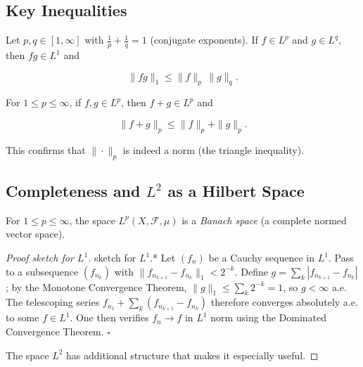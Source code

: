 \subsection{Key Inequalities}\label{sec:7.5.2}

\begin{theorem}\label{thm:7.28}
Let $p, q \in [1, \infty]$ with $\frac{1}{p} + \frac{1}{q} = 1$ (conjugate exponents). If $f \in L^p$ and $g \in L^q$, then $fg \in L^1$ and

\[
\|fg\|_1 \leq \|f\|_p \, \|g\|_q.
\]
\end{theorem}


\begin{theorem}\label{thm:7.29}
For $1 \leq p \leq \infty$, if $f, g \in L^p$, then $f + g \in L^p$ and

\[
\|f + g\|_p \leq \|f\|_p + \|g\|_p.
\]

This confirms that $\|\cdot\|_p$ is indeed a norm (the triangle inequality).
\end{theorem}


\subsection{Completeness and $L^2$ as a Hilbert Space}\label{sec:7.5.3}

\begin{theorem}\label{thm:7.30}
For $1 \leq p \leq \infty$, the space $L^p(X, \mathcal{F}, \mu)$ is a \textit{Banach space} (a complete normed vector space).
\end{theorem}


\begin{proof}[Proof sketch for $L^1$]
sketch for $L^1$.* Let $(f_n)$ be a Cauchy sequence in $L^1$. Pass to a subsequence $(f_{n_k})$ with $\|f_{n_{k+1}} - f_{n_k}\|_1 < 2^{-k}$. Define $g = \sum_{k} |f_{n_{k+1}} - f_{n_k}|$; by the Monotone Convergence Theorem, $\|g\|_1 \leq \sum_k 2^{-k} = 1$, so $g < \infty$ a.e. The telescoping series $f_{n_1} + \sum_k (f_{n_{k+1}} - f_{n_k})$ therefore converges absolutely a.e. to some $f \in L^1$. One then verifies $f_n \to f$ in $L^1$ norm using the Dominated Convergence Theorem. $\square$

The space $L^2$ has additional structure that makes it especially useful.

\end{proof}

